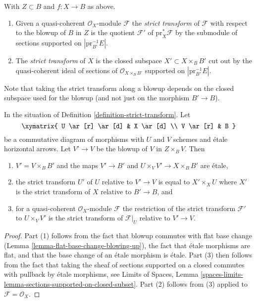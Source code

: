 \begin{definition}
\label{definition-strict-transform}
With $Z \subset B$ and $f : X \to B$ as above.
\begin{enumerate}
\item Given a quasi-coherent $\mathcal{O}_X$-module $\mathcal{F}$
the {\it strict transform} of $\mathcal{F}$ with respect to the blowup
of $B$ in $Z$ is the quotient $\mathcal{F}'$ of $\text{pr}_X^*\mathcal{F}$
by the submodule of sections supported on $|\text{pr}_{B'}^{-1}E|$.
\item The {\it strict transform} of $X$ is the closed subspace
$X' \subset X \times_B B'$ cut out by the quasi-coherent ideal of
sections of $\mathcal{O}_{X \times_B B'}$ supported on
$|\text{pr}_{B'}^{-1}E|$.
\end{enumerate}
\end{definition}

\noindent
Note that taking the strict transform along a blowup depends on the
closed subspace used for the blowup
(and not just on the morphism $B' \to B$).

\begin{lemma}
\label{lemma-strict-transform-local}
In the situation of Definition \ref{definition-strict-transform}.
Let
$$
\xymatrix{
U \ar[r] \ar[d] & X \ar[d] \\
V \ar[r] & B
}
$$
be a commutative diagram of morphisms with $U$ and $V$ schemes and
\'etale horizontal arrows. Let $V' \to V$ be the blowup of $V$
in $Z \times_B V$. Then
\begin{enumerate}
\item $V' = V \times_B B'$ and the maps
$V' \to B'$ and $U \times_V V' \to X \times_B B'$ are \'etale,
\item the strict transform $U'$ of $U$ relative to $V' \to V$
is equal to $X' \times_X U$ where $X'$ is the strict transform of $X$
relative to $B' \to B$, and
\item for a quasi-coherent $\mathcal{O}_X$-module $\mathcal{F}$ the
restriction of the strict transform $\mathcal{F}'$ to
$U \times_V V'$ is the strict transform of $\mathcal{F}|_U$ relative
to $V' \to V$.
\end{enumerate}
\end{lemma}

\begin{proof}
Part (1) follows from the fact that blowup commutes with flat base
change (Lemma \ref{lemma-flat-base-change-blowing-up}), the fact that
\'etale morphisms are flat, and that the base change of an \'etale
morphism is \'etale. Part (3) then follows from the fact that taking
the sheaf of sections supported on a closed commutes with pullback
by \'etale morphisms, see Limits of Spaces, Lemma
\ref{spaces-limits-lemma-sections-supported-on-closed-subset}.
Part (2) follows from (3) applied to $\mathcal{F} = \mathcal{O}_X$.
\end{proof}

